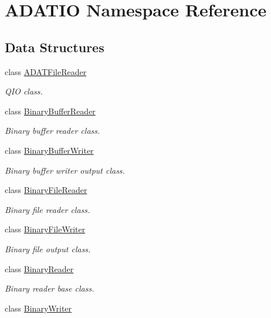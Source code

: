 \hypertarget{namespaceADATIO}{}\section{A\+D\+A\+T\+IO Namespace Reference}
\label{namespaceADATIO}
\subsection*{Data Structures}
\begin{DoxyCompactItemize}
\item 
class \mbox{\hyperlink{classADATIO_1_1ADATFileReader}{A\+D\+A\+T\+File\+Reader}}
\begin{DoxyCompactList}\small\item\em Q\+IO class. \end{DoxyCompactList}\item 
class \mbox{\hyperlink{classADATIO_1_1BinaryBufferReader}{Binary\+Buffer\+Reader}}
\begin{DoxyCompactList}\small\item\em Binary buffer reader class. \end{DoxyCompactList}\item 
class \mbox{\hyperlink{classADATIO_1_1BinaryBufferWriter}{Binary\+Buffer\+Writer}}
\begin{DoxyCompactList}\small\item\em Binary buffer writer output class. \end{DoxyCompactList}\item 
class \mbox{\hyperlink{classADATIO_1_1BinaryFileReader}{Binary\+File\+Reader}}
\begin{DoxyCompactList}\small\item\em Binary file reader class. \end{DoxyCompactList}\item 
class \mbox{\hyperlink{classADATIO_1_1BinaryFileWriter}{Binary\+File\+Writer}}
\begin{DoxyCompactList}\small\item\em Binary file output class. \end{DoxyCompactList}\item 
class \mbox{\hyperlink{classADATIO_1_1BinaryReader}{Binary\+Reader}}
\begin{DoxyCompactList}\small\item\em Binary reader base class. \end{DoxyCompactList}\item 
class \mbox{\hyperlink{classADATIO_1_1BinaryWriter}{Binary\+Writer}}

\end{DoxyCompactItemize}
